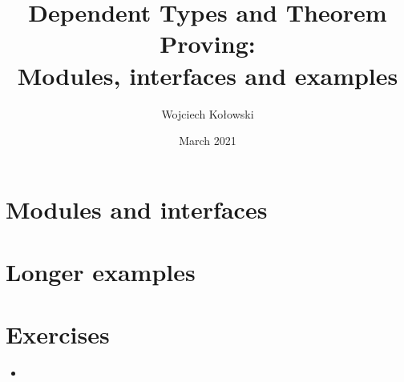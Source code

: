 \documentclass{beamer}
\title{Dependent Types and Theorem Proving: \\Modules, interfaces and examples}
\author{Wojciech Kołowski}
\date{March 2021}
\begin{document}
\frame{\titlepage}
\frame{\tableofcontents}

\section{Modules and interfaces}





\section{Longer examples}

\section{Exercises}

\begin{frame}{}
\begin{itemize}
	\item 
\end{itemize}
\end{frame}
\end{document}
